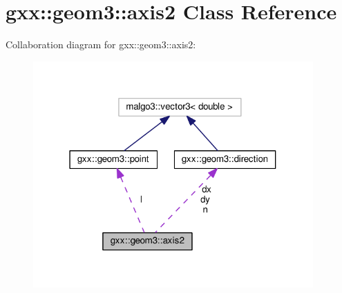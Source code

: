\hypertarget{classgxx_1_1geom3_1_1axis2}{}\section{gxx\+:\+:geom3\+:\+:axis2 Class Reference}
\label{classgxx_1_1geom3_1_1axis2}


Collaboration diagram for gxx\+:\+:geom3\+:\+:axis2\+:
\nopagebreak
\begin{figure}[H]
\begin{center}
\leavevmode
\includegraphics[width=304pt]{classgxx_1_1geom3_1_1axis2__coll__graph}
\end{center}
\end{figure}
